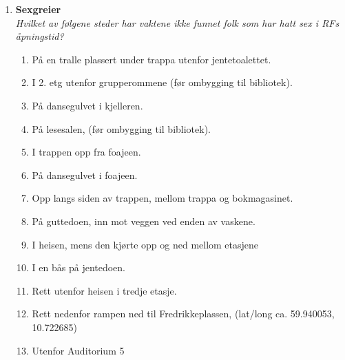 \documentclass[11pt]{article}
\begin{document}
\begin{enumerate}
\item \textbf{Sexgreier} \vspace{1mm}\\
\textit{Hvilket av følgene steder har vaktene ikke funnet folk som har hatt sex i RFs åpningstid?}
   \begin{enumerate}
\item På en tralle plassert under trappa utenfor jentetoalettet.
\item I 2. etg utenfor grupperommene (før ombygging til bibliotek).
\item På dansegulvet i kjelleren.
\item På lesesalen, (før ombygging til bibliotek).
\item I trappen opp fra foajeen.
\item På dansegulvet i foajeen.
\item Opp langs siden av trappen, mellom trappa og bokmagasinet.
\item På guttedoen, inn mot veggen ved enden av vaskene.
\item I heisen, mens den kjørte opp og ned mellom etasjene
\item I en bås på jentedoen.
\item Rett utenfor heisen i tredje etasje.
\item Rett nedenfor rampen ned til Fredrikkeplassen, (lat/long ca. 59.940053, 10.722685)
\item Utenfor Auditorium 5
    \end{enumerate}
  

\end{enumerate}
\end{document}
